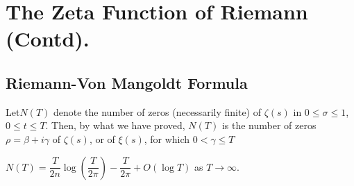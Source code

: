 
\chapter{The Zeta Function of Riemann (Contd).}\label{chap14}

\setcounter{section}{8}
\section[Riemann-Von Mangoldt Formula]{Riemann-Von Mangoldt Formula \cite[p.68]{key11}}\label{chap14:sec9}
Let\pageoriginale $N(T)$ denote the number of zeros (necessarily finite) of
$\zeta(s)$ in $0 \leq \sigma \leq 1$, $0 \leq t \leq T$. Then, by what
we have proved, $N(T)$ is the number of zeros $\rho = \beta + i
\gamma$ of $\zeta(s)$, or of $\xi (s)$, for which $0< \gamma \leq T$

\setcounter{thm}{0}
\begin{thm}\label{chap14:thm1}
$N(T) = \dfrac{T}{2n} \log \left(\dfrac{T}{2 \pi}\right) - \dfrac{T}{2\pi} + O(\log
  T)$ as $T \to \infty$.
\end{thm}

